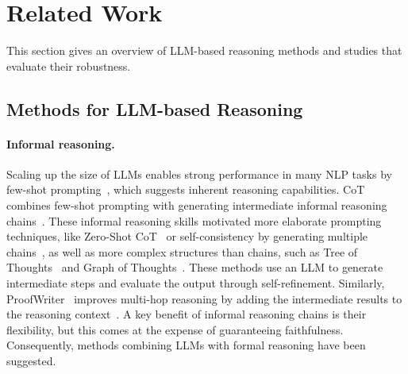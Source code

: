 \section{Related Work}

This section gives an overview of \ac{LLM}-based reasoning methods and studies that evaluate their robustness. 

\subsection{Methods for LLM-based Reasoning}
\paragraph{Informal reasoning.} 
Scaling up the size of \acp{LLM} enables strong performance in many \ac{NLP} tasks by few-shot prompting~\cite{brown_language_2020}, which suggests inherent reasoning capabilities.  
\ac{CoT} combines few-shot prompting with generating intermediate informal reasoning chains~\cite{wei_chain_2022}. 
These informal reasoning skills motivated more elaborate prompting techniques, like Zero-Shot \ac{CoT}~\cite{kojima_large_2022} or self-consistency by generating multiple chains~\cite{wang_selfconsistency_2022}, as well as more complex structures than chains, such as Tree of Thoughts~\cite{yao_tree_2023} and Graph of Thoughts~\cite{besta_graph_2024}. 
These methods use an \ac{LLM} to generate intermediate steps and evaluate the output through self-refinement.
Similarly, ProofWriter~\cite{tafjord_proofwriter_2021} improves multi-hop reasoning by adding the intermediate results to the reasoning context~\cite{tafjord_proofwriter_2021}.  
A key benefit of informal reasoning chains is their flexibility, but this comes at the expense of guaranteeing faithfulness. Consequently, methods combining \ac{LLM}s with formal reasoning have been suggested.

\noindent
